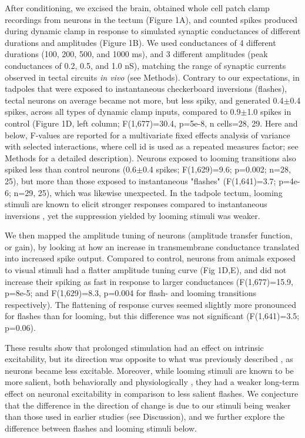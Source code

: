 \documentclass{article}
\begin{document}
After conditioning, we excised the brain, obtained whole cell patch clamp recordings from neurons in the tectum (Figure 1A), and counted spikes produced during dynamic clamp in response to simulated synaptic conductances of different durations and amplitudes (Figure 1B). We used conductances of 4 different durations (100, 200, 500, and 1000 ms), and 3 different amplitudes (peak conductances of 0.2, 0.5, and 1.0 nS), matching the range of synaptic currents observed in tectal circuits \textit{in vivo} (see Methods). Contrary to our expectations, in tadpoles that were exposed to instantaneous checkerboard inversions (flashes), tectal neurons on average became not more, but less spiky, and generated 0.4$\pm$0.4 spikes, across all types of dynamic clamp inputs, compared to 0.9$\pm$1.0 spikes in control (Figure 1D, left column; F(1,677)=30.4, p=5e-8, n cells=28, 29. Here and below, F-values are reported for a multivariate fixed effects analysis of variance with selected interactions, where cell id is used as a repeated measures factor; see Methods for a detailed description). Neurons exposed to looming transitions also spiked less than control neurons (0.6$\pm$0.4 spikes; F(1,629)=9.6; p=0.002; n=28, 25), but more than those exposed to instantaneous "flashes" (F(1,641)=3.7; p=4e-6; n=29, 25), which was likewise unexpected. In the tadpole tectum, looming stimuli are known to elicit stronger responses compared to instantaneous inversions \citep{khakhalin2014}, yet the suppression yielded by looming stimuli was weaker.

We then mapped the amplitude tuning of neurons (amplitude transfer function, or gain), by looking at how an increase in transmembrane conductance translated into increased spike output. Compared to control, neurons from animals exposed to visual stimuli had a flatter amplitude tuning curve (Fig 1D,E), and did not increase their spiking as fast in response to larger conductances (F(1,677)=15.9, p=8e-5; and F(1,629)=8.3, p=0.004 for flash- and looming transitions respectively). The flattening of response curves seemed slightly more pronounced for flashes than for looming, but this difference was not significant (F(1,641)=3.5; p=0.06). 

These results show that prolonged stimulation had an effect on intrinsic excitability, but its direction was opposite to what was previously described \citep{aizenman2003,ciarleglio2015}, as neurons became less excitable. Moreover, while looming stimuli are known to be more salient, both behaviorally and physiologically \citep{khakhalin2014}, they had a weaker long-term effect on neuronal excitability in comparison to less salient flashes. We conjecture that the difference in the direction of change is due to our stimuli being weaker than those used in earlier studies (see Discussion), and we further explore the difference between flashes and looming stimuli below.
\end{document}
